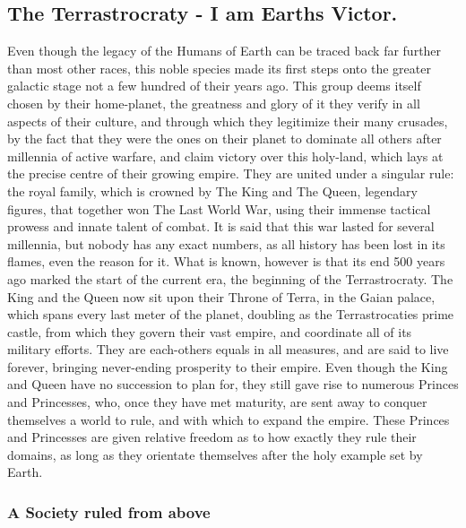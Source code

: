 \documentclass[a4paper,12pt]{report}
\begin{document}
\subsection{The Terrastrocraty -  I am Earths Victor.}
Even though the legacy of the Humans of Earth can be traced back far further than most other races, this noble species made its first steps onto the greater galactic stage not a few hundred of their years ago. This group deems itself chosen by their home-planet, the greatness and glory of it they verify in all aspects of their culture, and through which they legitimize their many crusades, by the fact that they were the ones on their planet to dominate all others after millennia of active warfare, and claim victory over this holy-land, which lays at the precise centre of their growing empire. They are united under a singular rule: the royal family, which is crowned by The King and The Queen, legendary figures, that together won The Last World War, using their immense tactical prowess and innate talent of combat. It is said that this war lasted for several millennia, but nobody has any exact numbers, as all history has been lost in its flames, even the reason for it. What is known, however is that its end 500 years ago marked the start of the current era, the beginning of the Terrastrocraty.  The King and the Queen now sit upon their Throne of Terra, in the Gaian palace, which spans every last meter of the planet, doubling as the Terrastrocaties prime castle, from which they govern their vast empire, and coordinate all of its military efforts. They are each-others equals in all  measures, and are said to live forever, bringing never-ending prosperity to their empire. Even though the King and Queen have no succession to plan for, they still gave rise to numerous Princes and Princesses, who, once they have met maturity, are sent away to conquer themselves a world to rule, and with which to expand the empire. These Princes and Princesses are given relative freedom as to how exactly they rule their domains, as long as they orientate themselves after the holy example set by Earth. \\

\subsubsection*{A Society ruled from above}
\end{document}
